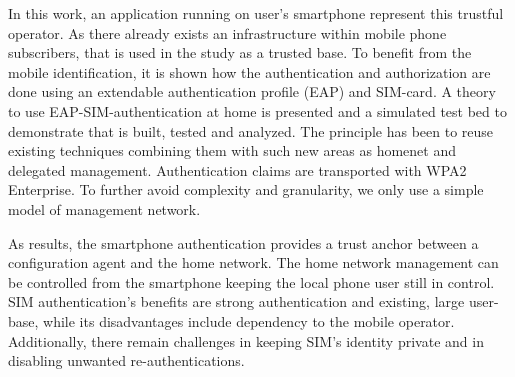 \documentclass[12pt,a4paper,english]{tutthesis}
\begin{document}
In this work, an application running on user's smartphone represent this trustful operator. 
As there already exists an infrastructure within mobile phone subscribers, that is used in the study as a trusted base.
To benefit from the mobile identification, it is shown how the authentication
and authorization are done using an extendable authentication profile (EAP) and SIM-card.
A theory to use EAP-SIM-authentication at home is presented and a simulated test bed
to demonstrate that is built, tested and analyzed.
The principle has been to reuse existing techniques combining them with such new areas as homenet and delegated management.
Authentication claims are transported with WPA2 Enterprise.
To further avoid complexity and granularity, we
only use a simple model of management network. 

As results, the smartphone authentication provides a trust anchor
between a configuration agent and the home network. 
The home network management can be controlled from the smartphone keeping
the local phone user still in control.
SIM authentication's benefits are strong 
authentication and existing, large user-base, while its disadvantages include
dependency to the mobile operator. Additionally, there remain challenges
in keeping SIM's identity private and in disabling unwanted 
re-authentications. %



\end{document}
